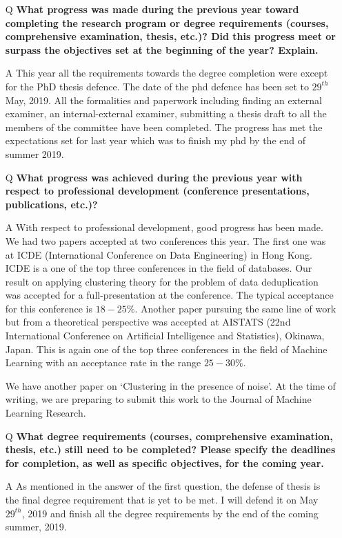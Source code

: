 \documentclass[12pt]{article}
\begin{document}
\begin{itemize}[leftmargin=*]
\item[Q] \textbf{What progress was made during the previous year toward completing the research program or degree requirements (courses, comprehensive examination, thesis, etc.)? Did this progress meet or surpass the objectives set at the beginning of the year? Explain.}
\item[A] \vspace{-0.1in} This year all the requirements towards the degree completion were except for the PhD thesis defence. The date of the phd defence  has been set to $29^{th}$ May, 2019. All the formalities and paperwork including finding an external examiner, an internal-external examiner, submitting a thesis draft to all the members of the committee have been completed. The progress has met the expectations set for last year which was to finish my phd by the end of summer 2019.

\item[Q] \textbf{What progress was achieved during the previous year with respect to professional development (conference presentations, publications, etc.)?}
\item[A] With respect to professional development, good progress has been made. We had two papers accepted at two conferences this year. The first one was at ICDE (International Conference on Data Engineering) in Hong Kong. ICDE is a one of the top three conferences in the field of databases. Our result on applying clustering theory for the problem of data deduplication was accepted for a full-presentation at the conference. The typical acceptance for this conference is $18-25\%$. Another paper pursuing the same line of work but from a theoretical perspective was accepted at AISTATS (22nd International Conference on Artificial Intelligence and Statistics), Okinawa, Japan. This is again one of the top three conferences in the field of Machine Learning with an acceptance rate in the range $25-30\%$. 

We have another paper on `Clustering in the presence of noise'. At the time of writing, we are preparing to submit this work to the Journal of Machine Learning Research. 

\item[Q] \textbf{What degree requirements (courses, comprehensive examination, thesis, etc.) still need to be completed? Please specify the deadlines for completion, as well as specific objectives, for the coming year.}
\item[A] As mentioned in the answer of the first question, the defense of thesis is the final degree requirement that is yet to be met. I will defend it on May $29^{th}$, 2019 and finish all the degree requirements by the end of the coming summer, 2019. 


\end{itemize}
\end{document}
